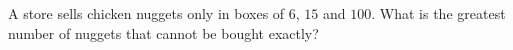 A store sells chicken nuggets only in boxes of $6$, $15$ and $100$. What is the greatest number of nuggets that cannot be bought exactly?
